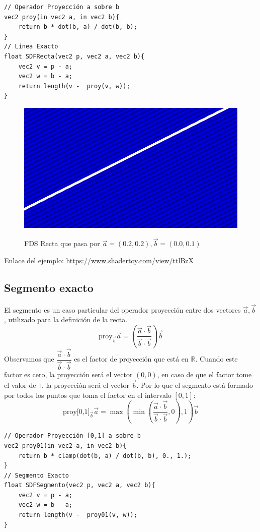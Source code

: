 \begin{lstlisting}
// Operador Proyección a sobre b
vec2 proy(in vec2 a, in vec2 b){
    return b * dot(b, a) / dot(b, b);
}
// Línea Exacto
float SDFRecta(vec2 p, vec2 a, vec2 b){
    vec2 v = p - a;
    vec2 w = b - a;
    return length(v -  proy(v, w));
}
\end{lstlisting}
\begin{figure}[H]
  \centering
  \captionsetup{justification=centering}%
  \includegraphics[width=1.0\textwidth]{secciones/imagenes/sdf/2d/sdf_recta.png}\label{fig:recta}
  \caption{FDS Recta que pasa por \(\Vec{a}=(0.2, 0.2), \Vec{b}=(0.0, 0.1)\)}
\end{figure}

Enlace del ejemplo: \url{https://www.shadertoy.com/view/ttlBzX}

\subsection{Segmento exacto}
El segmento es un caso particular del operador proyección entre dos vectores \(\Vec{a}, \Vec{b}\), utilizado para la definición de la recta. 
\[ \text{proy}_{\Vec{b}}\Vec{a}=\left(\dfrac{\Vec{a}\cdot \Vec{b}}{\Vec{b}\cdot \Vec{b}}\right)\Vec{b}\]
Observamos que \(\dfrac{\Vec{a}\cdot \Vec{b}}{\Vec{b}\cdot \Vec{b}}\) es el factor de proyección que está en \(\mathbb{R}\). Cuando este factor es cero, la proyección será el vector \((0,0)\), en caso de que el factor tome el valor de \(1\), la proyección será el vector \(\Vec{b}\). Por lo que el segmento está formado por todos los puntos que toma el factor en el intervalo \([0,1]\):
\[ \text{proy[0,1]}_{\Vec{b}}\Vec{a}=\max\left(\min\left(\dfrac{\Vec{a}\cdot \Vec{b}}{\Vec{b}\cdot \Vec{b}}, 0\right), 1\right)\Vec{b}\]

\begin{lstlisting}
// Operador Proyección [0,1] a sobre b
vec2 proy01(in vec2 a, in vec2 b){
    return b * clamp(dot(b, a) / dot(b, b), 0., 1.);
}
// Segmento Exacto
float SDFSegmento(vec2 p, vec2 a, vec2 b){
    vec2 v = p - a;
    vec2 w = b - a;
    return length(v -  proy01(v, w));
}
\end{lstlisting}

